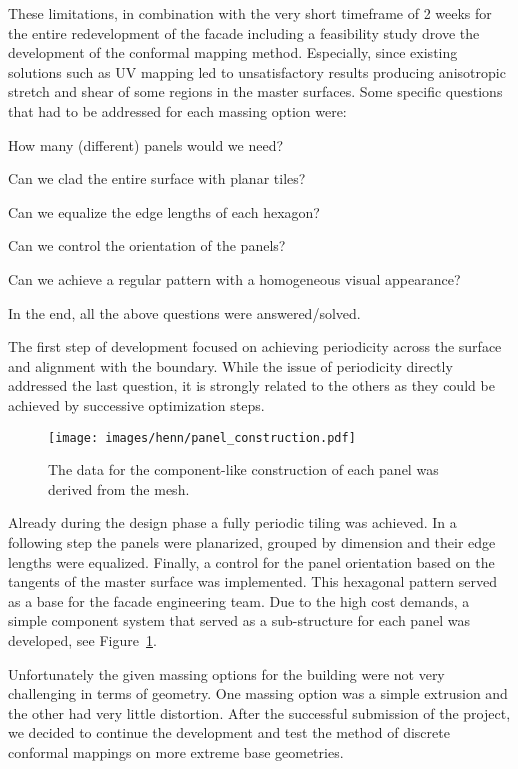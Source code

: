 \documentclass[Thesis.tex]{subfiles}
\begin{document}
These limitations, in combination with the very short timeframe of 2
weeks for the entire redevelopment of the facade including a
feasibility study drove the development of the conformal mapping
method. Especially, since existing solutions such as UV mapping led to
unsatisfactory results producing anisotropic stretch and shear of some
regions in the master surfaces.  Some specific questions that had to
be addressed for each massing option were:
\smallskip
\begin{compactitem}
\item How many (different) panels would we need?
\item Can we clad the entire surface with planar tiles?
\item Can we equalize the edge lengths of each hexagon?
\item Can we control the orientation of the panels?
\item Can we achieve a regular pattern with a homogeneous visual
  appearance?
\end{compactitem}
\smallskip
In the end, all the above questions were answered/solved.

The first step of development focused on achieving periodicity across
the surface and alignment with the boundary. While the issue of
periodicity directly addressed the last question, it is strongly
related to the others as they could be achieved by successive
optimization steps.

\begin{figure}[t]
  \centering
  \texttt{[image: images/henn/panel\_construction.pdf]}
  \caption{The data for the component-like construction of each panel was derived from the mesh.}
  \label{fig:panel_construction}
\end{figure}

Already during the design phase a fully periodic tiling was
achieved. In a following step the panels were planarized, grouped by
dimension and their edge lengths were equalized. Finally, a control
for the panel orientation based on the tangents of the \nurbs master
surface was implemented. This hexagonal pattern served as a base for
the facade engineering team. Due to the high cost demands, a simple
component system that served as a sub-structure for each panel was
developed, see Figure~\ref{fig:panel_construction}.

Unfortunately the given massing options for the building were not very
challenging in terms of geometry. One massing option was a simple
extrusion and the other had very little distortion. After the
successful submission of the project, we decided to continue the
development and test the method of discrete conformal mappings on more
extreme base geometries.
\end{document}
